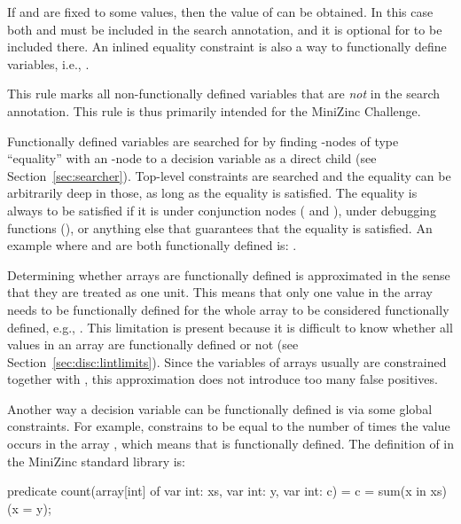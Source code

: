 \documentclass[a4paper,12pt]{article}
\begin{document}
If  and  are fixed to some values, then the value of  can be obtained. In this
case both  and  must be included in the search annotation, and it is optional for
 to be included there.
An inlined equality constraint
is also a way to functionally define variables, i.e., .

This rule marks all non-functionally defined variables that are \emph{not} in the
search annotation. This rule is thus primarily intended for the MiniZinc Challenge.

\begin{sloppypar}
Functionally defined variables are searched for by finding -nodes of type
``equality'' with an -node to a decision variable as a direct child (see Section~\ref{sec:searcher}).
Top-level constraints
are searched and the equality can be arbitrarily deep in those, as long as the equality is
satisfied. The equality is always to be satisfied if it is under conjunction nodes (\mi{/\\} and
), under debugging functions (), or anything else that guarantees that the equality is satisfied.
An example where  and
 are both functionally defined is: .
\end{sloppypar}

Determining whether arrays are functionally defined is approximated in the sense that they are treated as one unit.
This means that
only one value in the array needs to be functionally defined for the whole array to be
considered functionally defined, e.g., . This limitation is present because
it is difficult to know whether all values in an array are functionally defined or not
(see Section~\ref{sec:disc:lintlimits}). Since the variables of arrays usually are
constrained together with , this approximation does not introduce too many false positives.

Another way a decision variable can be functionally defined is via some global constraints.
For example,  constrains  to be equal to the
number of times the value  occurs in the array , which means that  is
functionally defined. The definition of  in the MiniZinc standard library is:
\begin{mznnobreak}
predicate count(array[int] of var int: xs,
                var int: y, var int: c) =
  c = sum(x in xs)(x = y);
\end{mznnobreak}
\end{document}

